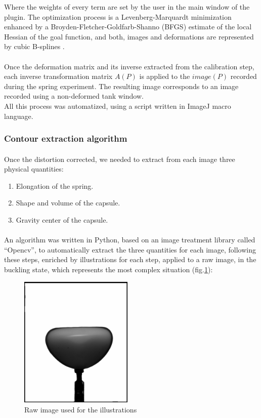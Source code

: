 Where the weights of every term are set by the user in the main window of the plugin. The optimization process is a Levenberg-Marquardt minimization enhanced by a Broyden-Fletcher-Goldfarb-Shanno (BFGS) estimate of the local Hessian of the goal function, and both, images and deformations are represented by cubic B-splines \cite{bunwrapJ,unwrapJ}. 

\paragraph{}
Once the deformation matrix and its inverse extracted from the calibration step, each inverse transformation matrix $A(P)$ is applied to the $image(P)$ recorded during the spring experiment. The resulting image corresponds to an image recorded using a non-deformed tank window.\\
All this process was automatized, using a script written in ImageJ macro language.
\subsubsection{Contour extraction algorithm}
\paragraph{}
Once the distortion corrected, we needed to extract from each image three physical quantities:
\begin{enumerate}
	\item Elongation of the spring.
	\item Shape and volume of the capsule.
	\item Gravity center of the capsule.
\end{enumerate}
\paragraph{}
An algorithm was written in Python, based on an image treatment library called "`Opencv"', to automatically extract the three quantities for each image, following these steps, enriched by illustrations for each step, applied to a raw image, in the buckling state, which represents the most complex  situation (fig.\ref{fig:raw_image}):
\begin{figure}[H] %
	\centering%
  \includegraphics[width=0.48\textwidth]{figures/Chapter_1/raw_image.png}
	\caption{Raw image used for the illustrations}
	\label{fig:raw_image}
\end{figure}

